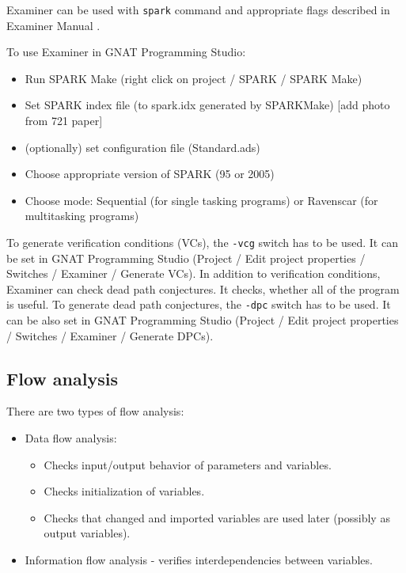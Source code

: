 Examiner can be used with \lstinline{spark} command and appropriate flags described in Examiner Manual \cite{Examiner:Online}.

To use Examiner in GNAT Programming Studio:
\begin{itemize}
	\item Run SPARK Make (right click on project / SPARK / SPARK Make)
	\item Set SPARK index file (to spark.idx generated by SPARKMake) [add photo from 721 paper]
	\item (optionally) set configuration file (Standard.ads)
	\item Choose appropriate version of SPARK (95 or 2005)
	\item Choose mode: Sequential (for single tasking programs) or Ravenscar (for multitasking programs)
\end{itemize}

To generate verification conditions (VCs), the \lstinline{-vcg} switch has to be used. It can be set in GNAT Programming Studio (Project / Edit project properties / Switches / Examiner / Generate VCs).
In addition to verification conditions, Examiner can check dead path conjectures. It checks, whether all of the program is useful. To generate dead path conjectures, the \lstinline{-dpc} switch has to be used. It can be also set in GNAT Programming Studio (Project / Edit project properties / Switches / Examiner / Generate DPCs).


\subsection{Flow analysis}
\label{verification:examiner:flowanalysis}
There are two types of flow analysis:
\begin{itemize}
	\item Data flow analysis:
	\begin{itemize}
		\item Checks input/output behavior of parameters and variables.
		\item Checks initialization of variables.
		\item Checks that changed and imported variables are used later (possibly as output variables).
	\end{itemize}
	\item Information flow analysis - verifies interdependencies between variables.
\end{itemize}

